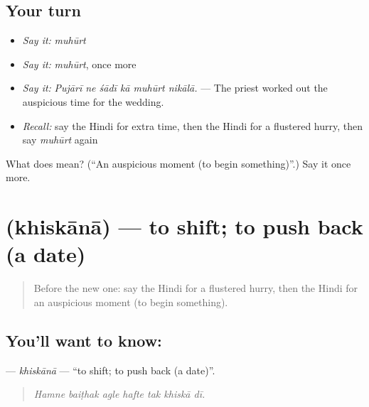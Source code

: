 \subsection*{Your turn}
\begin{itemize}
\raggedright
  \item \emph{Say it:} \emph{muhūrt}
  \item \emph{Say it:} \emph{muhūrt}, once more
  \item \emph{Say it:} \emph{Pujārī ne śādī kā muhūrt nikālā.} — The priest worked out the auspicious time for the wedding.
  \item \emph{Recall:} say the Hindi for extra time, then the Hindi for a flustered hurry, then say \emph{muhūrt} again
\end{itemize}

\begin{tcolorbox}[breakable,colback=teal!4,colframe=teal!35!black,title={Before you move on}]
What does  mean? (\textquotedblleft{}An auspicious moment (to begin something)\textquotedblright{}.) Say it once more.
\end{tcolorbox}
\section[\texorpdfstring{\hi{खिसकाना} (khiskānā)}{खिसकाना (khiskānā)}]{ (khiskānā) — to shift; to push back (a date)}

\label{lesson:HI-C537-khiskana}



\begin{quote}
Before the new one: say the Hindi for a flustered hurry, then the Hindi for an auspicious moment (to begin something).
\end{quote}

\subsection*{You'll want to know: }
\textbf{} — \emph{khiskānā} — \textquotedblleft{}to shift; to push back (a date)\textquotedblright{}.

\begin{quote}
      
\end{quote}

\begin{quote}
\emph{Hamne baiṭhak agle hafte tak khiskā dī.}
\end{quote}

